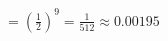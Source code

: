 \documentclass[preview]{standalone}
\begin{document}
\begin{align*}
= \left(\frac{1}{2}\right)^9 = \frac{1}{512} \approx 0.00195
\end{align*}
\end{document}
